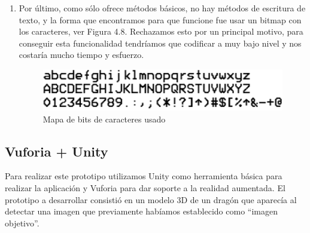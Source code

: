 \begin{enumerate}
\begin{figure}
    \end{figure}
    \item Por último, como sólo ofrece métodos básicos, no hay métodos de escritura de texto, y la forma que 
    encontramos para que funcione fue usar un bitmap con los caracteres, ver Figura 4.8. Rechazamos esto por un principal motivo, para conseguir esta funcionalidad tendríamos que codificar a muy bajo nivel y 
    nos costaría mucho tiempo y esfuerzo.
    \begin{figure}
        \centering
        \includegraphics[width=5in]{figures/bitmap-font.png}
        \caption{Mapa de bits de caracteres usado}
    \end{figure}
\end{enumerate}

\subsection{Vuforia + Unity} 
\label{makereference3.6.4}

    Para realizar este prototipo utilizamos Unity como herramienta básica para realizar la aplicación y Vuforia para dar soporte a la realidad aumentada.
    El prototipo a desarrollar consistió en un modelo 3D de un dragón que aparecía al detectar una imagen que previamente habíamos establecido como ``imagen objetivo''.

